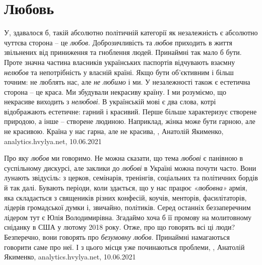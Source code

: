  
 
 
 
 
\chapter{Любовь}

У, здавалося б, такій абсолютно політичній категорії як незалежність є
абсолютно чуттєва сторона – це \emph{любов}. Доброзичливість та \emph{любов}
приходить в життя звільнених від приниження та гноблення людей. Принаймні так
мало б бути.  Проте значна частина власників українських паспортів відчувають
взаємну \emph{нелюбов} та непотрібність у власній країні. Якщо бути об’єктивним
і більш точним: не люблять нас, але \emph{не любимо} і ми.  У незалежності
також є естетична сторона – це краса. Ми збудували некрасиву країну. І ми
розуміємо, що некрасиве виходить з \emph{нелюбові}. В українській мові є два
слова, котрі відображають естетичне: гарний і красивий. Перше більше
характеризує створене природою, а інше – створене людиною. Наприклад, жінка
може бути гарною, але не красивою. Країна у нас гарна, але не красива,
, Анатолій Якименко, analytics.hvylya.net, 10.06.2021

Про яку \emph{любов} ми говоримо. Не можна сказати, що тема \emph{любові} є
панівною в суспільному дискурсі, але заклики до \emph{любові} в Україні можна
почути часто. Вони лунають звідусіль: з церков, семінарів, тренінгів,
соціальних та політичних бордів й так далі. Бувають періоди, коли здається, що
у нас працює \emph{«любовна»} армія, яка складається з священиків різних
конфесій, коучів, менторів, фасилітаторів, лідерів громадської думки і,
звичайно, політиків. Серед останніх беззаперечним лідером тут є Юлія
Володимирівна. Згадаймо хоча б її промову на молитовному сніданку в США у
лютому 2018 року.  Отже, про що говорять всі ці люди? Безперечно, вони говорять
про \emph{безумовну любов}. Принаймні намагаються говорити саме про неї. І з
цього місця уже починаються проблеми, 
, Анатолій Якименко, analytics.hvylya.net, 10.06.2021

